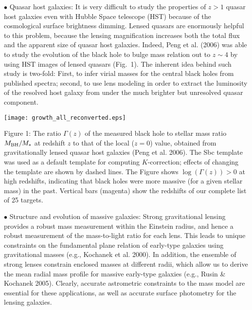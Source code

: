 \documentclass[a4paper,11pt]{article}
\begin{document}
$\bullet$ Quasar host galaxies: It is very difficult to study the
properties of $z>1$ quasar host galaxies even with Hubble Space
telescope (HST) because of the cosmological surface brightness
dimming. Lensed quasars are enormously helpful to this problem,
because the lensing magnification increases both the total flux and
the apparent size of quasar host galaxies. Indeed, Peng et al. (2006)
was able to study the evolution of the black hole to bulge mass
relation out to $z\sim 4$ by using HST images of lensed quasars
(Fig.~1). The inherent idea behind such study is two-fold: First,  to infer virial masses
 for the central black holes from published spectra; second, to use lens 
 modeling in order to extract the luminosity of the 
 resolved host galaxy from under the much brighter but unresolved quasar component.

\medskip

\begin{minipage}{0.55\textwidth}
\texttt{[image: growth\_all\_reconverted.eps]}
\end{minipage}
\begin{minipage}{0.41\textwidth}
  Figure 1: The ratio $\Gamma(z)$ of the measured black hole to
  stellar mass ratio $M_{\rm BH}/M_*$ at redshift $z$ to that of the
  local ($z=0$) value, obtained from gravitationally lensed quasar
  host galaxies (Peng et al. 2006). The Sbc template was used as a
  default template for computing $K$-correction; effects of changing
  the template are shown by dashed lines. The Figure shows
  $\log(\Gamma(z))>0$ at high redshifts, indicating that black holes
  were more massive (for a given stellar mass) in the past. Vertical
  bars (magenta) show the redshifts of our complete list of 25 targets.  
\end{minipage}

\medskip


$\bullet$ Structure and evolution of massive galaxies: Strong
gravitational lensing provides a robust mass measurement within the
Einstein radius, and hence a robust measurement of the mass-to-light
ratio for each lens. This leads to unique constraints on the
fundamental plane relation of early-type galaxies using gravitational
masses (e.g., Kochanek et al. 2000). In addition, the ensemble of strong
lenses  constrain enclosed masses at different radii, which allow us to
derive the mean radial mass profile for massive early-type galaxies
(e.g., Rusin \& Kochanek 2005). Clearly, accurate astrometric
constraints to the mass model are essential for these applications, as
well as accurate surface photometry for the lensing galaxies.
\end{document}
